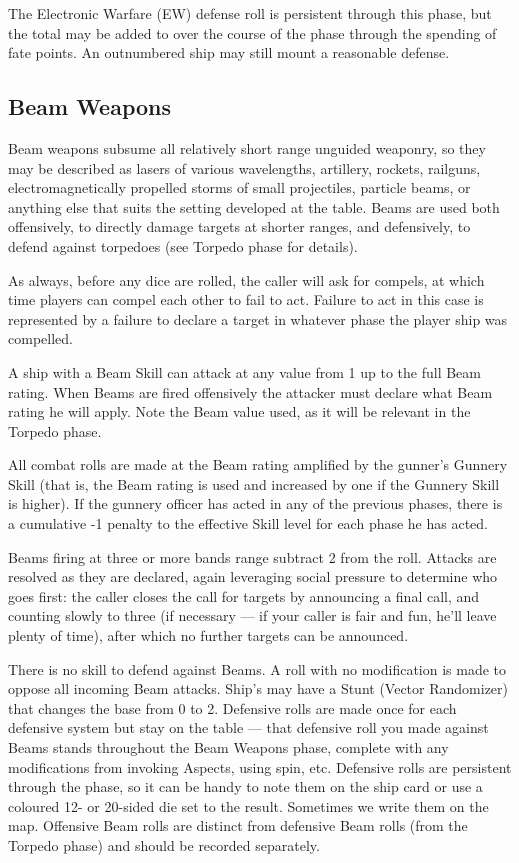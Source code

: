 The Electronic Warfare (EW) defense roll is persistent through this phase, but the total may be added to over the course of the phase through the spending of fate points. An outnumbered ship may still mount a reasonable defense.


\subsection{Beam Weapons}\label{sec:Beam Weapons} %

Beam weapons subsume all relatively short range unguided weaponry, so they may be described as lasers of various wavelengths, artillery, rockets, railguns, electromagnetically propelled storms of small projectiles, particle beams, or anything else that suits the setting developed at the table. Beams are used both offensively, to directly damage targets at shorter ranges, and defensively, to defend against torpedoes (see Torpedo phase for details).

As always, before any dice are rolled, the caller will ask for compels, at which time players can compel each other to fail to act. Failure to act in this case is represented by a failure to declare a target in whatever phase the player ship was compelled.

A ship with a Beam Skill can attack at any value from 1 up to the full Beam rating. When Beams are fired offensively the attacker must declare what Beam rating he will apply. Note the Beam value used, as it will be relevant in the Torpedo phase.

All combat rolls are made at the Beam rating amplified by the gunner's Gunnery Skill (that is, the Beam rating is used and increased by one if the Gunnery Skill is higher). If the gunnery officer has acted in any of the previous phases, there is a cumulative -1 penalty to the effective Skill level for each phase he has acted. 

Beams firing at three or more bands range subtract 2 from the roll. Attacks are resolved as they are declared, again leveraging social pressure to determine who goes first: the caller closes the call for targets by announcing a final call, and counting slowly to three (if necessary --- if your caller is fair and fun, he'll leave plenty of time), after which no further targets can be announced.

There is no skill to defend against Beams. A roll with no modification is made to oppose all incoming Beam attacks. Ship's may have a Stunt (Vector Randomizer) that changes the base from 0 to 2.
Defensive rolls are made once for each defensive system but stay on the table --- that defensive roll you made against Beams stands throughout the Beam Weapons phase, complete with any modifications from invoking Aspects, using spin, etc. Defensive rolls are persistent through the phase, so it can be handy to note them on the ship card or use a coloured 12- or 20-sided die set to the result. Sometimes we write them on the map. Offensive Beam rolls are distinct from defensive Beam rolls (from the Torpedo phase) and should be recorded separately.

